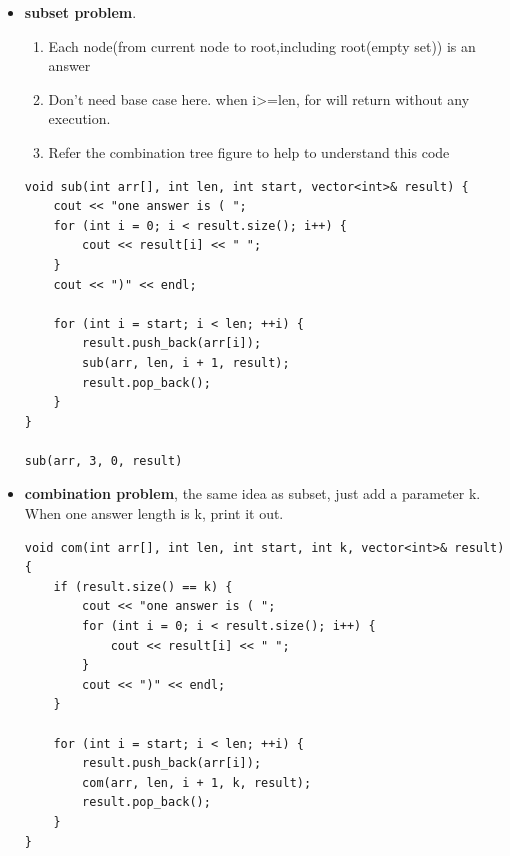 \documentclass[a4paper,11pt,twoside]{book}
\begin{document}
\begin{itemize}
\begin{itemize}
\end{itemize}

	\item \textbf{subset problem}. 
\begin{enumerate}
	\item Each node(from current node to root,including root(empty set)) is an answer
	\item Don't need base case here.  when i>=len, for will return without any execution.
	\item Refer the combination tree figure to help to understand this code
\end{enumerate}
	
\begin{lstlisting}
void sub(int arr[], int len, int start, vector<int>& result) {
	cout << "one answer is ( ";
	for (int i = 0; i < result.size(); i++) {
		cout << result[i] << " ";
	}
	cout << ")" << endl;
	
	for (int i = start; i < len; ++i) {
		result.push_back(arr[i]);  
		sub(arr, len, i + 1, result);
		result.pop_back();
	}
}

sub(arr, 3, 0, result)
\end{lstlisting}
	
	\item \textbf{combination problem}, the same idea as subset, just add a parameter k. When one answer length is k, print it out. 
\begin{lstlisting}
void com(int arr[], int len, int start, int k, vector<int>& result){
	if (result.size() == k) {
		cout << "one answer is ( ";
		for (int i = 0; i < result.size(); i++) {
			cout << result[i] << " ";
		}
		cout << ")" << endl;
	}
	
	for (int i = start; i < len; ++i) {
		result.push_back(arr[i]);  
		com(arr, len, i + 1, k, result);
		result.pop_back();
	}
}	
\end{lstlisting}


\end{itemize}
\end{document}
